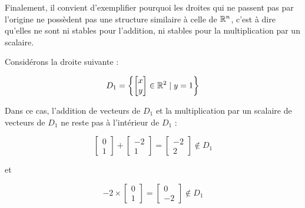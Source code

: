 Finalement, il convient d'exemplifier pourquoi les droites qui ne passent pas par l'origine ne possèdent pas une structure similaire à celle de $\mathbb{R}^n$, c'est à dire qu'elles ne sont ni stables pour l'addition, ni stables pour la multiplication par un scalaire.

Considérons la droite suivante :

\[
D_1 = \left\{\begin{bmatrix}x\\y\end{bmatrix} \in \mathbb{R}^2 \mid y = 1\right\}
\]

\begin{center}
\end{center}

Dans ce cas, l'addition de vecteurs de $D_1$ et la multiplication par un scalaire de vecteurs de $D_1$ ne reste pas à l'intérieur de $D_1$ :

\[
\begin{bmatrix}0\\1\end{bmatrix} + \begin{bmatrix}-2\\1\end{bmatrix} = \begin{bmatrix}-2\\2\end{bmatrix} \notin D_1
\]

et

\[
-2 \times \begin{bmatrix}0\\1\end{bmatrix} = \begin{bmatrix}0\\-2\end{bmatrix} \notin D_1
\]

